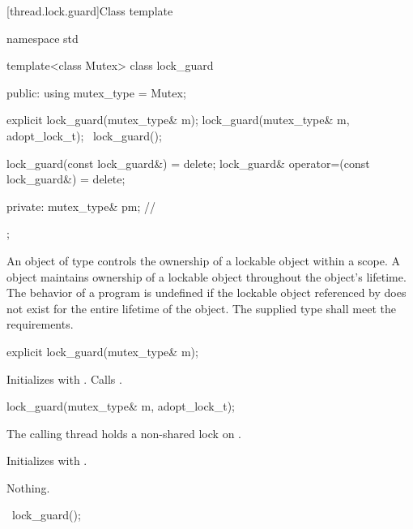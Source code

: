 [thread.lock.guard]{Class template }

%
\begin{codeblock}
namespace std {
  template<class Mutex>
  class lock_guard {
  public:
    using mutex_type = Mutex;

    explicit lock_guard(mutex_type& m);
    lock_guard(mutex_type& m, adopt_lock_t);
    ~lock_guard();

    lock_guard(const lock_guard&) = delete;
    lock_guard& operator=(const lock_guard&) = delete;

  private:
    mutex_type& pm;             // \expos
  };
}
\end{codeblock}

\pnum
An object of type  controls the ownership of a lockable object
within a scope. A  object maintains ownership of a lockable
object throughout the  object's lifetime.
The behavior of a program is undefined if the lockable object referenced by
 does not exist for the entire lifetime of the 
object. The supplied  type shall meet the 
requirements.

%
\begin{itemdecl}
explicit lock_guard(mutex_type& m);
\end{itemdecl}

\begin{itemdescr}
\pnum
\effects
Initializes  with . Calls .
\end{itemdescr}

%
\begin{itemdecl}
lock_guard(mutex_type& m, adopt_lock_t);
\end{itemdecl}

\begin{itemdescr}
\pnum
\expects
The calling thread holds a non-shared lock on .

\pnum
\effects
Initializes  with .

\pnum
\throws
Nothing.
\end{itemdescr}

%
\begin{itemdecl}
~lock_guard();
\end{itemdecl}

